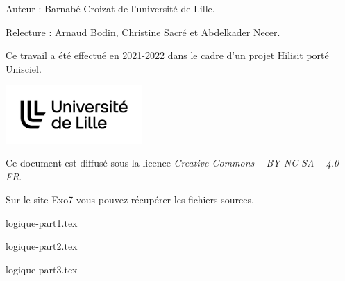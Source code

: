 \documentclass[11pt,a4paper]{report}
\begin{document}
\bigskip
\bigskip



\vfill

\begin{center}
\begin{minipage}{0.8\textwidth}
\center
Auteur : Barnabé Croizat de l'université de Lille.

Relecture : Arnaud Bodin, Christine Sacré et Abdelkader Necer.

  \medskip
  
Ce travail a été effectué en 2021-2022 dans le cadre d'un projet Hilisit porté  Unisciel.
\end{minipage}

  \medskip

\qquad\qquad
\includegraphics[height=2.2cm]{logo-ulille}

  \medskip
  
Ce document est diffusé sous la licence \emph{Creative Commons -- BY-NC-SA -- 4.0 FR}.


Sur le site Exo7 vous pouvez récupérer les fichiers sources.

\vspace*{0cm}

\end{center}


\newpage



{logique-part1.tex}
\newpage

{logique-part2.tex}
\newpage

{logique-part3.tex}
\newpage


\end{document}
